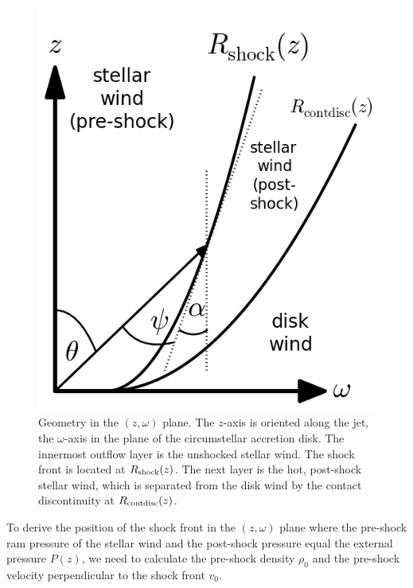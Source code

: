 \documentclass[manuscript]{aastex}
\begin{document}
\begin{figure}[h!]
\begin{center}
\includegraphics[width=0.35\columnwidth]{figures/sketch/sketch.png}
\caption{\label{fig:sketch}
Geometry in the $(z, \omega)$ plane. The $z$-axis is oriented along the jet, the $\omega$-axis in the plane of the circumstellar accretion disk. The innermost outflow layer is the unshocked stellar wind. The shock front is located at $R_{\rm{shock}}(z)$. The next layer is the hot, post-shock stellar wind, which is separated from the disk wind by the contact discontinuity at $R_{\rm{contdisc}}(z)$.}
\end{center}
\end{figure}

To derive the position of the shock front in the $(z, \omega)$ plane where the pre-shock ram pressure of the stellar wind and the post-shock pressure equal the external pressure $P(z)$, we need to calculate the pre-shock density $\rho_0$ and the pre-shock velocity perpendicular to the shock front $v_0$.
\end{document}
